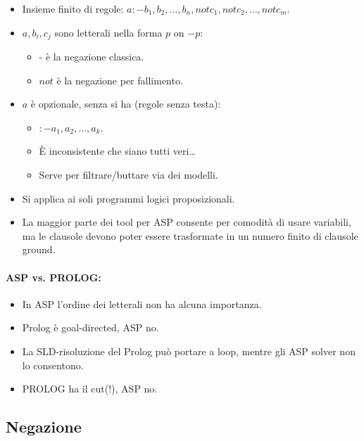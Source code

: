 \begin{itemize}
  \item Insieme finito di regole: $a :- b_1, b_2, \dots, b_n, not c_1, not c_2, \dots, not c_m$. 
  \item $a, b_i, c_j$ sono letterali nella forma $p$ on $- p$:
    \begin{itemize}
      \item - è la negazione classica. 
      \item $not$ è la negazione per fallimento.
    \end{itemize}
  \item $a$ è opzionale, senza si ha  (regole senza testa): 
    \begin{itemize}
      \item $:- a_1, a_2, \dots, a_k$.
      \item È inconsistente che siano tutti veri\dots
      \item Serve per filtrare/buttare via dei modelli.
    \end{itemize}
  \item Si applica ai soli programmi logici proposizionali. 
  \item La maggior parte dei tool per ASP consente per
comodità di usare variabili, ma le clausole devono poter
essere trasformate in un numero finito di clausole ground.
\end{itemize}

\paragraph{ASP vs. PROLOG:}

\begin{itemize}
  \item In ASP l’ordine dei letterali non ha alcuna importanza. 
  \item Prolog è goal-directed, ASP no. 
  \item La SLD-risoluzione del Prolog può portare a loop,
mentre gli ASP solver non lo consentono. 
\item PROLOG ha il cut(!), ASP no.
\end{itemize}

\subsection{Negazione}

